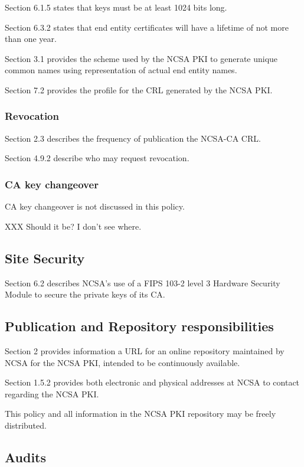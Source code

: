 \documentclass[10pt]{article}
\begin{document}
Section 6.1.5 states that keys must be at least 1024 bits long.

Section 6.3.2 states that end entity certificates will have a lifetime
of not more than one year.

Section 3.1 provides the scheme used by the NCSA PKI to generate
unique common names using representation of actual end entity names.

Section 7.2 provides the profile for the CRL generated by the NCSA
PKI.

\subsubsection{Revocation}

Section 2.3 describes the frequency of publication the NCSA-CA CRL.

Section 4.9.2 describe who may request revocation.

\subsubsection{CA key changeover}

CA key changeover is not discussed in this policy.

XXX Should it be? I don't see where.

\subsection{Site Security}

Section 6.2 describes NCSA's use of a FIPS 103-2 level 3 Hardware
Security Module to secure the private keys of its CA.

\subsection {Publication and Repository responsibilities}

Section 2 provides information a URL for an online repository
maintained by NCSA for the NCSA PKI, intended to be continuously
available.

Section 1.5.2 provides both electronic and physical addresses at NCSA
to contact regarding the NCSA PKI.

This policy and all information in the NCSA PKI repository may be
freely distributed.

\subsection{Audits}
\end{document}
